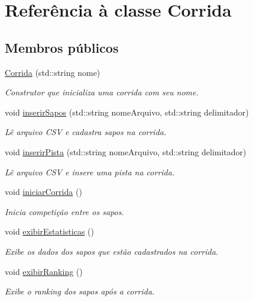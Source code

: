 \hypertarget{classCorrida}{}\section{Referência à classe Corrida}
\label{classCorrida}
\subsection*{Membros públicos}
\begin{DoxyCompactItemize}
\item 
\hyperlink{classCorrida_a007ea8b554b61d017f10d02ab1e10428}{Corrida} (std\+::string nome)
\begin{DoxyCompactList}\small\item\em Construtor que inicializa uma corrida com seu nome. \end{DoxyCompactList}\item 
void \hyperlink{classCorrida_aee79fcba9ecca389b2e31f517490fc73}{inserir\+Sapos} (std\+::string nome\+Arquivo, std\+::string delimitador)
\begin{DoxyCompactList}\small\item\em Lê arquivo C\+SV e cadastra sapos na corrida. \end{DoxyCompactList}\item 
void \hyperlink{classCorrida_a3a135667906e66adbe1a38ecdae0c048}{inserir\+Pista} (std\+::string nome\+Arquivo, std\+::string delimitador)
\begin{DoxyCompactList}\small\item\em Lê arquivo C\+SV e insere uma pista na corrida. \end{DoxyCompactList}\item 
void \hyperlink{classCorrida_a814cb193a7e47d7693543ce870cf192e}{iniciar\+Corrida} ()
\begin{DoxyCompactList}\small\item\em Inicia competição entre os sapos. \end{DoxyCompactList}\item 
void \hyperlink{classCorrida_a8bd6f41f4e0c7929c302feb13a01e0d5}{exibir\+Estatisticas} ()
\begin{DoxyCompactList}\small\item\em Exibe os dados dos sapos que estão cadastrados na corrida. \end{DoxyCompactList}\item 
void \hyperlink{classCorrida_a54889f450b35f0617b715a62c379d2cb}{exibir\+Ranking} ()
\begin{DoxyCompactList}\small\item\em Exibe o ranking dos sapos após a corrida. \end{DoxyCompactList}\item 

\end{DoxyCompactItemize}
